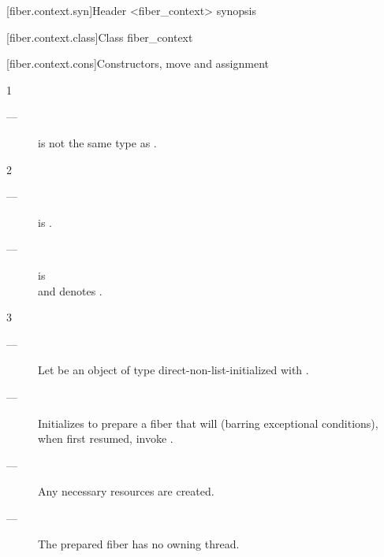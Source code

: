 [fiber.context.syn]{Header <fiber\_context> synopsis}


[fiber.context.class]{Class fiber\_context}


\newcommand{\state}{\cpp{state}}

[fiber.context.cons]{Constructors, move and assignment}


1 \constraints
\begin{description}
    \item[---]  is not the same type as \fiber.
\end{description}

2 \mandates
\begin{description}
    \item[---]  is \true.
    \item[---]  is \true\\
               and  denotes \fiber\cpp{\&\&}.
\end{description}

3 \effects
\begin{description}
    \item[---] Let  be an object of
               type  direct-non-list-initialized
               with . 
    \item[---] Initializes  to prepare a fiber that will (barring
               exceptional conditions), when first resumed, invoke .
    \item[---] Any necessary resources are created. 
    \item[---] The prepared fiber has no owning thread.
\end{description}

